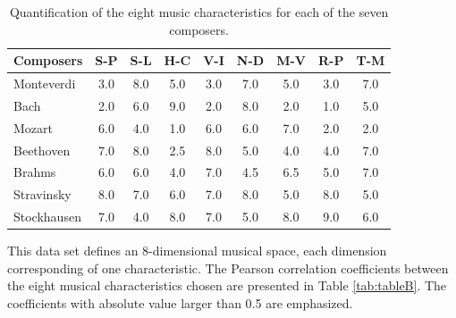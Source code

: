 \documentclass[
 aip,
 jmp,
 amsmath,amssymb,
 reprint,
]{revtex4-1}
\begin{document}
\begin{table}[ht]
\caption{\label{tab:tableA}Quantification of the
eight music characteristics for each of the seven composers.}

\begin{ruledtabular}
\begin{tabular}{|l||c|c|c|c|c|c|c|c|}

 Composers    & S-P & S-L & H-C & V-I & N-D & M-V & R-P & T-M  \\
\hline
 Monteverdi   & 3.0 & 8.0 & 5.0 & 3.0 & 7.0 & 5.0 & 3.0 & 7.0  \\
 Bach         & 2.0 & 6.0 & 9.0 & 2.0 & 8.0 & 2.0 & 1.0 & 5.0  \\
 Mozart       & 6.0 & 4.0 & 1.0 & 6.0 & 6.0 & 7.0 & 2.0 & 2.0  \\
 Beethoven    & 7.0 & 8.0 & 2.5 & 8.0 & 5.0 & 4.0 & 4.0 & 7.0  \\
 Brahms       & 6.0 & 6.0 & 4.0 & 7.0 & 4.5 & 6.5 & 5.0 & 7.0  \\
 Stravinsky   & 8.0 & 7.0 & 6.0 & 7.0 & 8.0 & 5.0 & 8.0 & 5.0  \\
 Stockhausen  & 7.0 & 4.0 & 8.0 & 7.0 & 5.0 & 8.0 & 9.0 & 6.0  \\

\end{tabular}
\end{ruledtabular}
\end{table}

This data set defines an 8-dimensional musical space, each dimension
corresponding of one characteristic. The
Pearson correlation coefficients between the eight musical
characteristics chosen are presented in Table \ref{tab:tableB}.
The coefficients with absolute value larger than 0.5 are emphasized.
\end{document}
